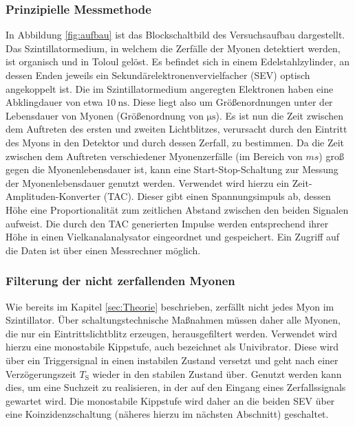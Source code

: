 \subsubsection{Prinzipielle Messmethode}
In Abbildung \ref{fig:aufbau} ist das Blockschaltbild des Versuchsaufbau dargestellt.
Das Szintillatormedium, in welchem die Zerfälle der Myonen detektiert werden, ist organisch und in Toloul gelöst. Es befindet sich in einem Edelstahlzylinder, an dessen Enden jeweils ein Sekundärelektronenvervielfacher (SEV) optisch angekoppelt ist.
Die im Szintillatormedium angeregten Elektronen haben eine Abklingdauer von etwa $\SI{10}{\nano\second}$. Diese liegt also um Größenordnungen unter der Lebensdauer von Myonen (Größenordnung von $\si{\micro\second}$).
Es ist nun die Zeit zwischen dem Auftreten des ersten und zweiten Lichtblitzes, verursacht durch den Eintritt des Myons in den Detektor und durch dessen Zerfall, zu bestimmen.
Da die Zeit zwischen dem Auftreten verschiedener Myonenzerfälle (im Bereich von $\si{ms}$) groß gegen die Myonenlebensdauer ist, kann eine Start-Stop-Schaltung zur Messung der Myonenlebensdauer genutzt werden.
Verwendet wird hierzu ein Zeit-Amplituden-Konverter (TAC). Dieser gibt einen Spannungsimpuls ab, dessen Höhe eine Proportionalität zum zeitlichen Abstand zwischen den beiden Signalen aufweist.
Die durch den TAC generierten Impulse werden entsprechend ihrer Höhe in einen Vielkanalanalysator eingeordnet und gespeichert. Ein Zugriff auf die Daten ist über einen Messrechner möglich.

\subsubsection{Filterung der nicht zerfallenden Myonen}
Wie bereits im Kapitel \ref{sec:Theorie} beschrieben, zerfällt nicht jedes Myon im Szintillator. Über schaltungstechnische Maßnahmen müssen daher alle Myonen, die nur ein Eintrittslichtblitz erzeugen, herausgefiltert werden.
Verwendet wird hierzu eine monostabile Kippstufe, auch bezeichnet als Univibrator. Diese wird über ein Triggersignal in einen instabilen Zustand versetzt und geht nach einer Verzögerungszeit $T_{\mathrm{S}}$ wieder in den stabilen Zustand über.
Genutzt werden kann dies, um eine Suchzeit zu realisieren, in der auf den Eingang eines Zerfallssignals gewartet wird.
Die monostabile Kippstufe wird daher an die beiden SEV über eine Koinzidenzschaltung (näheres hierzu im nächsten Abschnitt) geschaltet.

